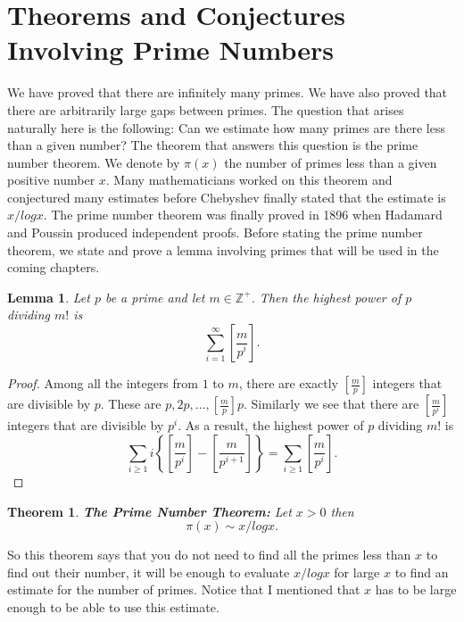 \documentclass[12pt,letterpaper]{book}
\newtheorem{theorem}{Theorem}
\newtheorem{lemma}{Lemma}
\begin{document}
\section{Theorems and Conjectures Involving Prime Numbers}
We have proved that there are infinitely many primes.  We have also
proved that there are arbitrarily large gaps between primes.  The
question that arises naturally here is the following: Can we
estimate how many primes are there less than a given number?  The
theorem that answers this question is the prime number theorem.  We
denote by $\pi(x)$ the number of primes less than a given positive
number $x$. Many mathematicians worked on this theorem and
conjectured many estimates before Chebyshev finally stated that the
estimate is $x/log x$.  The prime number theorem was finally proved
in 1896 when Hadamard and Poussin produced independent proofs.
Before stating the prime number theorem, we state and prove a lemma
involving primes that will be used in the coming chapters.

\begin{lemma}
Let $p$ be a prime and let $m\in \mathbb{Z^+}$. Then the highest
power of $p$ dividing $m!$ is
\begin{equation*}
\sum_{i=1}^\infty\left[\frac{m}{p^i}\right].
\end{equation*}
\end{lemma}

\begin{proof}
Among all the integers from $1$ to $m$, there are exactly
$\left[\frac{m}{p}\right]$ integers that are divisible by $p$. These
are $p,2p,...,\left[\frac{m}{p}\right]p$.  Similarly we see that
there are $\left[\frac{m}{p^i}\right]$ integers that are divisible
by $p^i$. As a result, the highest power of $p$ dividing $m!$ is
\begin{equation*}
\sum_{i\geq
1}i\left\{\left[\frac{m}{p^i}\right]-\left[\frac{m}{p^{i+1}}\right]\right\}=\sum_{i\geq
1} \left[\frac{m}{p^i}\right].
\end{equation*}
\end{proof}
\begin{theorem}
\textbf{The Prime Number Theorem:} Let $x>0$ then
\begin{equation*}
\pi(x)\sim x/log x.
\end{equation*}
\end{theorem}

So this theorem says that you do not need to find all the primes
less than $x$ to find out their number, it will be enough to
evaluate $x/log x$ for large $x$ to find an estimate for the number
of primes. Notice that I mentioned that $x$ has to be large enough
to be able to use this estimate.
\end{document}
